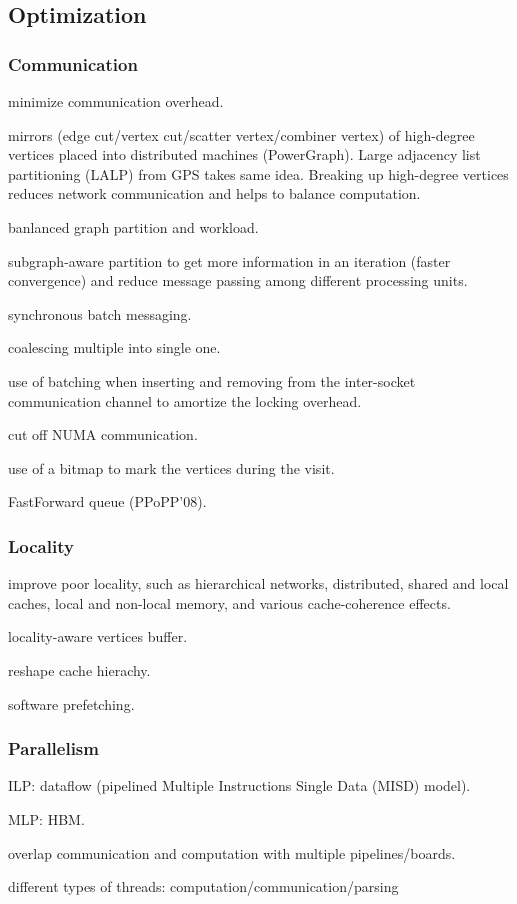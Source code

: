 \documentclass[UTF8,12pt,a4paper]{article}
\begin{document}
\subsection{Optimization}
\subsubsection{Communication}
\begin{compactitem}
  \item minimize communication overhead.
  \item mirrors (edge cut/vertex cut/scatter vertex/combiner vertex)
  of high-degree vertices placed into distributed machines (PowerGraph).
  Large adjacency list partitioning (LALP) from GPS takes same idea.
  Breaking up high-degree vertices reduces network communication
  and helps to balance computation.
  \item banlanced graph partition and workload.
  \item subgraph-aware partition to get more information in an iteration (faster convergence)
  and reduce message passing among different processing units.
  \item synchronous batch messaging.
  \item coalescing multiple into single one.
  \item use of batching when inserting and removing
  from the inter-socket communication channel to amortize the locking overhead.
  \item cut off NUMA communication.
  \item use of a bitmap to mark the vertices during the visit.
  \item FastForward queue (PPoPP'08).
\end{compactitem}
\subsubsection{Locality}
\begin{compactitem}
  \item improve poor locality, such as
  hierarchical networks, distributed,
  shared and local caches, local and non-local memory,
  and various cache-coherence effects.
  \item locality-aware vertices buffer.
  \item reshape cache hierachy.
  \item software prefetching.
\end{compactitem}
\subsubsection{Parallelism}
\begin{compactitem}
  \item ILP: dataflow (pipelined Multiple Instructions Single Data (MISD) model).
  \item MLP: HBM.
  \item overlap communication and computation with multiple pipelines/boards.
  \item different types of threads: computation/communication/parsing
\end{compactitem}
\end{document}
